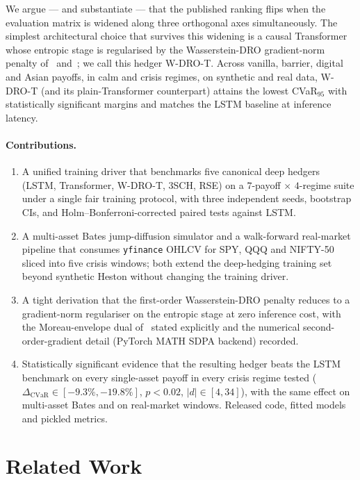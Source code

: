 \documentclass[11pt]{article}
\newcommand{\cvar}{\mathrm{CVaR}}
\begin{document}
We argue --- and substantiate --- that the published ranking flips when the evaluation matrix is widened along three orthogonal axes simultaneously.  The simplest architectural choice that survives this widening is a causal Transformer whose entropic stage is regularised by the Wasserstein-DRO gradient-norm penalty of~\citet{blanchet2019quantifying} and~\citet{esfahani2018data}; we call this hedger W-DRO-T.  Across vanilla, barrier, digital and Asian payoffs, in calm and crisis regimes, on synthetic and real data, W-DRO-T (and its plain-Transformer counterpart) attains the lowest CVaR$_{95}$ with statistically significant margins and matches the LSTM baseline at inference latency.

\paragraph{Contributions.}
\begin{enumerate}[leftmargin=*,noitemsep]
\item A unified training driver that benchmarks five canonical deep hedgers (LSTM, Transformer, W-DRO-T, 3SCH, RSE) on a $7$-payoff $\times$ $4$-regime suite under a single fair training protocol, with three independent seeds, bootstrap CIs, and Holm--Bonferroni-corrected paired tests against LSTM.
\item A multi-asset Bates jump-diffusion simulator and a walk-forward real-market pipeline that consumes \texttt{yfinance} OHLCV for SPY, QQQ and NIFTY-50 sliced into five crisis windows; both extend the deep-hedging training set beyond synthetic Heston without changing the training driver.
\item A tight derivation that the first-order Wasserstein-DRO penalty reduces to a gradient-norm regulariser on the entropic stage at zero inference cost, with the Moreau-envelope dual of~\citet{blanchet2019quantifying} stated explicitly and the numerical second-order-gradient detail (PyTorch MATH SDPA backend) recorded.
\item Statistically significant evidence that the resulting hedger beats the LSTM benchmark on every single-asset payoff in every crisis regime tested ($\Delta_{\cvar}\in[-9.3\%,-19.8\%]$, $p<0.02$, $|d|\in[4,34]$), with the same effect on multi-asset Bates and on real-market windows.  Released code, fitted models and pickled metrics.
\end{enumerate}

\section{Related Work}
\label{sec:related}
\end{document}
